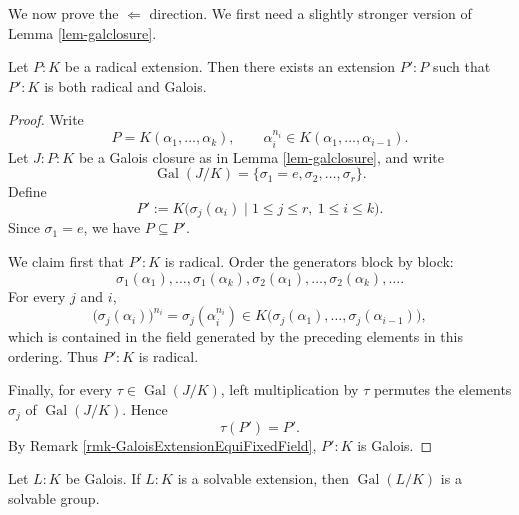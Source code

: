 We now prove the $\Leftarrow$ direction. We first need a slightly stronger version of Lemma \ref{lem-galclosure}.

\begin{lemma}\label{lem-radgalois}
    Let $P:K$ be a radical extension. Then there exists an extension $P':P$ such that $P':K$ is both radical and Galois.
\end{lemma}

\begin{proof}
    Write
    \[
    P=K(\alpha_1,\dots,\alpha_k),
    \qquad
    \alpha_i^{n_i}\in K(\alpha_1,\dots,\alpha_{i-1}).
    \]
    Let $J:P:K$ be a Galois closure as in Lemma \ref{lem-galclosure}, and write
    \[
    \operatorname{Gal}(J/K)=\{\sigma_1=e,\sigma_2,\dots,\sigma_r\}.
    \]
    Define
    \[
    P':=K\bigl(\sigma_j(\alpha_i)\mid
    1\leq j\leq r,\ 1\leq i\leq k\bigr).
    \]
    Since $\sigma_1=e$, we have $P\subseteq P'$.

    We claim first that $P':K$ is radical. Order the generators block by block:
    \[
    \sigma_1(\alpha_1),\dots,\sigma_1(\alpha_k),
    \sigma_2(\alpha_1),\dots,\sigma_2(\alpha_k),\dots.
    \]
    For every $j$ and $i$,
    \[
    \bigl(\sigma_j(\alpha_i)\bigr)^{n_i}
    =\sigma_j(\alpha_i^{n_i})
    \in K\bigl(\sigma_j(\alpha_1),\dots,
    \sigma_j(\alpha_{i-1})\bigr),
    \]
    which is contained in the field generated by the preceding elements in this ordering. Thus $P':K$ is radical.

    Finally, for every $\tau\in\operatorname{Gal}(J/K)$, left multiplication by $\tau$ permutes the elements $\sigma_j$ of $\operatorname{Gal}(J/K)$. Hence
    \[
    \tau(P')=P'.
    \]
    By Remark \ref{rmk-GaloisExtensionEquiFixedField}, $P':K$ is Galois.
\end{proof}

\begin{theorem}
    Let $L:K$ be Galois. If $L:K$ is a solvable extension, then
    $\operatorname{Gal}(L/K)$ is a solvable group.
\end{theorem}

